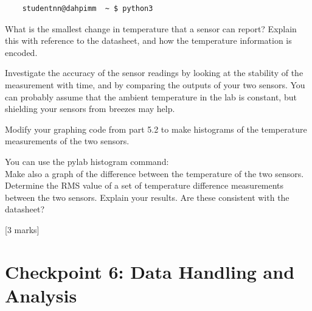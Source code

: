 \begin{enumerate}
\begin{verbatim}
    studentnn@dahpimm  ~ $ python3
\end{verbatim}


What is the smallest change in temperature that a sensor can report? Explain this with reference to the datasheet, and how the temperature information is encoded.

Investigate the accuracy of the sensor readings by looking at the stability of the measurement with time, and by comparing the outputs of your two sensors. You can probably assume that the ambient temperature in the lab is constant, but shielding your sensors from breezes may help.

Modify your graphing code from part 5.2 to make histograms of the temperature measurements of the two sensors. 

You can use the pylab histogram command:\\

Make also a graph of the difference between the temperature of the two sensors. Determine the RMS value of a set of temperature difference measurements between the two sensors. Explain your results. Are these consistent with the datasheet?

\hfill [3 marks]


\end{enumerate}


\newpage
\section{Checkpoint 6: Data Handling and Analysis}

